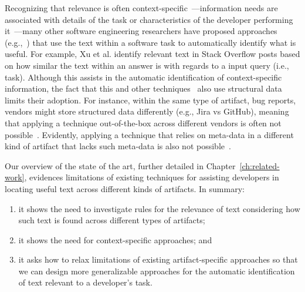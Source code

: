 Recognizing that relevance is often context-specific~\cite{Bavota2016}---information needs are associated with details of the task 
or characteristics of the developer performing it~\cite{Robillard2015}---many other software engineering researchers 
have proposed approaches (e.g.,~\cite{Ye2016, silva2019, Xu2017}) that 
use the text within a software task 
to automatically identify what is useful.
For example, Xu et al. identify relevant text in Stack Overflow posts 
based on how similar the text within an answer is with regards to a input query (i.e., task).
Although this assists in the automatic identification of context-specific information, 
the fact that this and other techniques~\cite{silva2019, Li2018}
also use structural data limits their adoption. 
For instance, within the same type of artifact, bug reports,
vendors might store structured data differently (e.g., Jira vs GitHub),
meaning that applying a technique 
 out-of-the-box across different vendors is often not possible~\cite{Bavota2016}.
Evidently, applying a technique that relies on 
meta-data in a different kind of artifact that lacks such meta-data
is also not possible~\cite{arnaoudova2015}.




Our overview of the state of the art, further detailed in Chapter~\ref{ch:related-work},
evidences limitations of existing techniques for
assisting developers in locating useful text across different kinds of artifacts.
In summary:

\begin{enumerate}
    \item it shows the need to investigate rules for the relevance of text 
    considering how such text is found across different types of artifacts;
    \item it shows the need for context-specific approaches; and 
    \item it asks how to relax limitations of existing
    artifact-specific approaches so that we can design 
    more generalizable approaches for the automatic identification
    of text relevant to a developer's task.
\end{enumerate}


